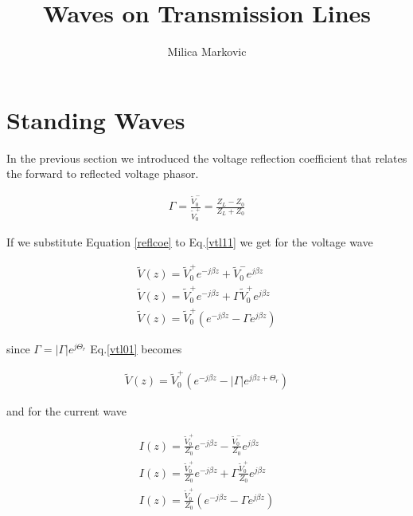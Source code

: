 \documentclass{ximera}
\title{Waves on Transmission Lines}
\author{Milica Markovic}
\begin{document}
  
\begin{abstract}  

\end{abstract}  
\maketitle    





\section{Standing Waves}


In the previous section we introduced the voltage reflection
coefficient that relates the forward to reflected voltage phasor.


\begin{eqnarray}
\Gamma = \frac{\tilde{V}_0^-}{\tilde{V}_0^+} = \frac{Z_L -Z_0}{Z_L +Z_0} \label{reflcoe}
\end{eqnarray}


If we substitute Equation \ref{reflcoe} to Eq.\ref{vtl11} we get for the voltage wave

\begin{eqnarray}
\tilde{V}(z) = \tilde{V}_0^+ e^{-j \beta z} +\tilde{V}_0^- e^{j \beta z} \label{vtl11}\\
\tilde{V}(z) = \tilde{V}_0^+ e^{-j \beta z} + \Gamma  \tilde{V}_0^+ e^{j \beta z} \nonumber
\\
\tilde{V}(z)= \tilde{V}_0^+ (e^{-j \beta z} - \Gamma  e^{j \beta z}  ) \label{vtl01}
\end{eqnarray}

since $\Gamma = |\Gamma| e^{j \Theta_r}$ Eq.\ref{vtl01} becomes


\begin{eqnarray}
\tilde{V}(z)= \tilde{V}_0^+ (e^{-j \beta z} - |\Gamma|  e^{j \beta z + \Theta_r}  ) \label{vtl011}
\end{eqnarray}



and for the current wave



\begin{eqnarray}
I(z) = \frac{\tilde{V}_0^+}{Z_0} e^{-j \beta z} -  \frac{\tilde{V}_0^-}{Z_0} e^{j \beta z} \label{ctl1}\\
I(z) =  \frac{\tilde{V}_0^+}{Z_0}  e^{-j \beta z} + \Gamma \frac{\tilde{V}_0^+}{Z_0}  e^{j \beta z} \nonumber
\\
I(z)=   \frac{\tilde{V}_0^+}{Z_0}  (e^{-j \beta z} - \Gamma  e^{j \beta z}  ) \label{ctl01}
\end{eqnarray}
\end{document}
